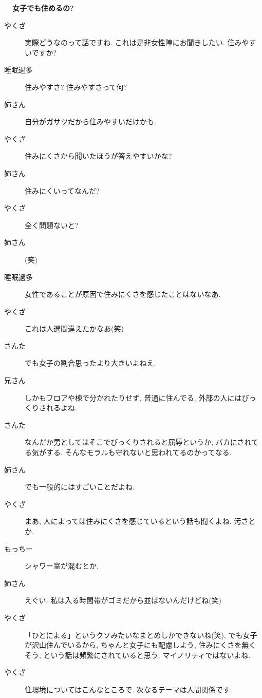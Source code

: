 \documentclass[10pt,b5jsbook,dvips,dvipdfmx,openany]{jsbook}
\theoremstyle{definition}
\begin{document}
		\textbf{---女子でも住めるの? }
		\begin{description}
		\item[やくざ]実際どうなのって話ですね. これは是非女性陣にお聞きしたい. 住みやすいですか?
		\item[睡眠過多]住みやすさ? 住みやすさって何?
		\item[姉さん]自分がガサツだから住みやすいだけかも.
		\item[やくざ]住みにくさから聞いたほうが答えやすいかな?
		\item[姉さん]住みにくいってなんだ?
		\item[やくざ]全く問題ないと?
		\item[姉さん](笑)
		\item[睡眠過多]女性であることが原因で住みにくさを感じたことはないなあ.
		\item[やくざ]これは人選間違えたかなあ(笑)
		\item[さんた]でも女子の割合思ったより大きいよねえ.
		\item[兄さん]しかもフロアや棟で分かれたりせず, 普通に住んでる. 外部の人にはびっくりされるよね.
		\item[さんた]なんだか男としてはそこでびっくりされると屈辱というか, バカにされてる気がする. そんなモラルも守れないと思われてるのかってなる.
		\item[姉さん]でも一般的にはすごいことだよね.
		\item[やくざ]まあ, 人によっては住みにくさを感じているという話も聞くよね. 汚さとか.
		\item[もっちー]シャワー室が混むとか.
		\item[姉さん]えぐい. 私は入る時間帯がゴミだから並ばないんだけどね(笑)
		\item[やくざ]「ひとによる」というクソみたいなまとめしかできないね(笑). でも女子が沢山住んでいるから, ちゃんと女子にも配慮しよう, 住みにくさを無くそう, という話は頻繁にされていると思う. マイノリティではないよね.
		\item[やくざ]住環境についてはこんなところで. 次なるテーマは人間関係です.
		\end{description}
\end{document}
